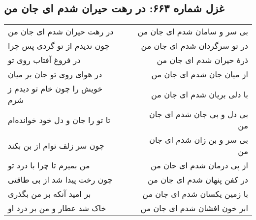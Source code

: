 \begin{center}
\section*{غزل شماره ۶۶۳: در رهت حیران شدم ای جان من}
\label{sec:663}
\begin{longtable}{l p{0.5cm} r}
در رهت حیران شدم ای جان من
&&
بی سر و سامان شدم ای جان من
\\
چون ندیدم از تو گردی پس چرا
&&
در تو سرگردان شدم ای جان من
\\
در فروغ آفتاب روی تو
&&
ذرهٔ حیران شدم ای جان من
\\
در هوای روی تو جان بر میان
&&
از میان جان شدم ای جان من
\\
خویش را چون خام تو دیدم ز شرم
&&
با دلی بریان شدم ای جان من
\\
تا تو را جان و دل خود خوانده‌ام
&&
بی دل و بی جان شدم ای جان من
\\
چون سر زلف توام از بن بکند
&&
بی سر و بن زان شدم ای جان من
\\
من بمیرم تا چرا با درد تو
&&
از پی درمان شدم ای جان من
\\
چون رخت پیدا شد از بی طاقتی
&&
در کفن پنهان شدم ای جان من
\\
بر امید آنکه بر من بگذری
&&
با زمین یکسان شدم ای جان من
\\
خاک شد عطار و من بر درد او
&&
ابر خون افشان شدم ای جان من
\\
\end{longtable}
\end{center}
